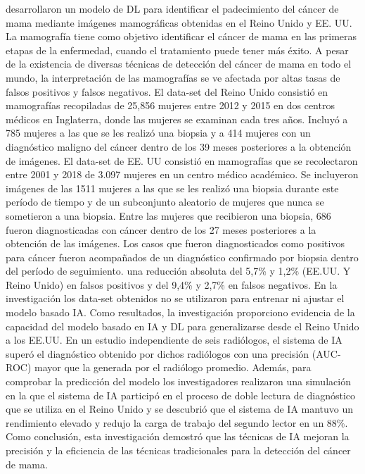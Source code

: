 \cite{McKinney2020} desarrollaron un modelo de DL para identificar el padecimiento del cáncer de mama mediante imágenes mamográficas obtenidas en el Reino Unido y EE. UU. La mamografía tiene como objetivo identificar el cáncer de mama en las primeras etapas de la enfermedad, cuando el tratamiento puede tener más éxito. A pesar de la existencia de diversas técnicas de detección del cáncer de mama en todo el mundo, la interpretación de las mamografías se ve afectada por altas tasas de falsos positivos y falsos negativos. El data-set del Reino Unido consistió en mamografías recopiladas de 25,856 mujeres entre 2012 y 2015 en dos centros médicos en Inglaterra, donde las mujeres se examinan cada tres años. Incluyó a 785 mujeres a las que se les realizó una biopsia y a 414 mujeres con un diagnóstico maligno del cáncer dentro de los 39 meses posteriores a la obtención de imágenes. El data-set de EE. UU consistió en mamografías que se recolectaron entre 2001 y 2018 de 3.097 mujeres en un centro médico académico. Se incluyeron imágenes de las 1511 mujeres a las que se les realizó una biopsia durante este período de tiempo y de un subconjunto aleatorio de mujeres que nunca se sometieron a una biopsia. Entre las mujeres que recibieron una biopsia, 686 fueron diagnosticadas con cáncer dentro de los 27 meses posteriores a la obtención de las imágenes. Los casos que fueron diagnosticados como positivos para cáncer fueron acompañados de un diagnóstico confirmado por biopsia dentro del período de seguimiento. una reducción absoluta del 5,7\% y 1,2\% (EE.UU. Y Reino Unido) en falsos positivos y del 9,4\% y 2,7\% en falsos negativos. En la investigación los data-set obtenidos no se utilizaron para entrenar ni ajustar el modelo basado IA. Como resultados, la investigación proporciono evidencia de la capacidad del modelo basado en IA y DL para generalizarse desde el Reino Unido a los EE.UU. En un estudio independiente de seis radiólogos, el sistema de IA superó el diagnóstico obtenido por dichos radiólogos con una precisión (AUC-ROC) mayor que la generada por el radiólogo promedio. Además, para comprobar la predicción del modelo los investigadores realizaron una simulación en la que el sistema de IA participó en el proceso de doble lectura de diagnóstico que se utiliza en el Reino Unido y se descubrió que el sistema de IA mantuvo un rendimiento elevado y redujo la carga de trabajo del segundo lector en un 88\%. Como conclusión, esta investigación demostró que las técnicas de IA mejoran la precisión y la eficiencia de las técnicas tradicionales para la detección del cáncer de mama.


